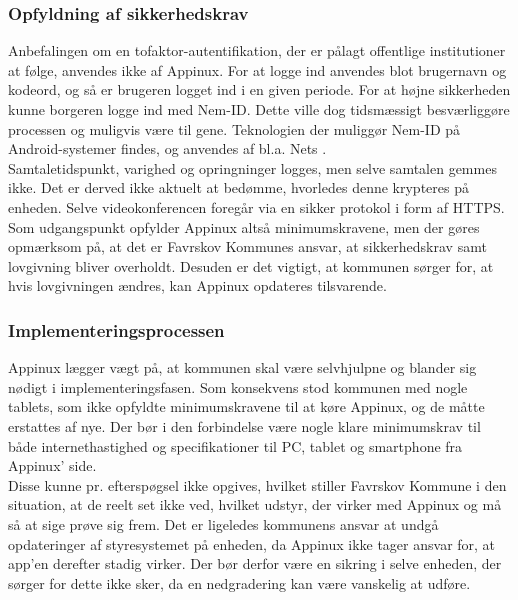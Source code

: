 \subsubsection{Opfyldning af sikkerhedskrav}
Anbefalingen om en tofaktor-autentifikation, der er pålagt offentlige institutioner at følge, anvendes ikke af Appinux. For at logge ind anvendes blot brugernavn og kodeord, og så er brugeren logget ind i en given periode. For at højne sikkerheden kunne borgeren logge ind med Nem-ID. Dette ville dog tidsmæssigt besværliggøre processen og muligvis være til gene. Teknologien der muliggør Nem-ID på Android-systemer findes, og anvendes af bl.a. Nets \parencite{netsapp}.\\
Samtaletidspunkt, varighed og opringninger logges, men selve samtalen gemmes ikke. Det er derved ikke aktuelt at bedømme, hvorledes denne krypteres på enheden. Selve videokonferencen foregår via en sikker protokol i form af HTTPS.\\Som udgangspunkt opfylder Appinux altså minimumskravene, men der gøres opmærksom på, at det er Favrskov Kommunes ansvar, at sikkerhedskrav samt lovgivning bliver overholdt. Desuden er det vigtigt, at kommunen sørger for, at hvis lovgivningen ændres, kan Appinux opdateres tilsvarende.

\subsubsection{Implementeringsprocessen}
Appinux lægger vægt på, at kommunen skal være selvhjulpne og blander sig nødigt i implementeringsfasen. Som konsekvens stod kommunen med nogle tablets, som ikke opfyldte minimumskravene til at køre Appinux, og de måtte erstattes af nye. Der bør i den forbindelse være nogle klare minimumskrav til både internethastighed og specifikationer til PC, tablet og smartphone fra Appinux' side.\\Disse kunne pr. efterspøgsel ikke opgives, hvilket stiller Favrskov Kommune i den situation, at de reelt set ikke ved, hvilket udstyr, der virker med Appinux og må så at sige prøve sig frem. Det er ligeledes kommunens ansvar at undgå opdateringer af styresystemet på enheden, da Appinux ikke tager ansvar for, at app'en derefter stadig virker. Der bør derfor være en sikring i selve enheden, der sørger for dette ikke sker, da en nedgradering kan være vanskelig at udføre.
